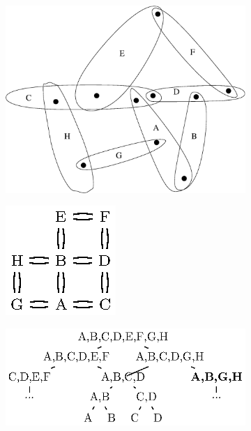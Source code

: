 \begin{figure}\centering
    \begin{subfigure}{0.2\linewidth}\centering
        \includegraphics[height=\myMinHeight]{img/bodypin}
        \caption{}\label{fig:bodypindrp:a}
    \end{subfigure}
    \hfill
    \begin{subfigure}{0.2\linewidth}\centering
        \includegraphics[height=\myMinHeight]{img/epsfromtikz/bodypin_graph}
        \caption{}\label{fig:bodypindrp:b}
    \end{subfigure}
    \hfill
    \begin{subfigure}{0.35\linewidth}\centering
        \includegraphics[height=\myMinHeight]{img/epsfromtikz/bodypin_drp}

\end{subfigure}
\end{figure}
